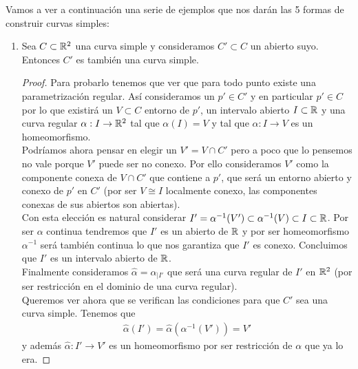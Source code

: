 \begin{ejemplo}\label{ej:construccion} Vamos a ver a continuación una serie de ejemplos que nos darán las 5 formas de construir curvas simples:
    \begin{enumerate}
        \item\label{ej:abierto} Sea $C\subset \mathbb{R}^2$ una curva simple y consideramos $C'\subset C$ un abierto suyo. Entonces $C'$ es también una curva simple.
        \begin{proof}
            Para probarlo tenemos que ver que para todo punto existe una parametrización regular. Así consideramos un $p'\in C'$ y en particular $p'\in C$ por lo que existirá un $V\subset C$ entorno de $p'$, un intervalo abierto $I\subset \mathbb{R}$ y una curva regular $\alpha : I \to \mathbb{R}^2$ tal que $\alpha(I)=V$ y tal que $\alpha : I \to V$ es un homeomorfismo.\\

            Podríamos ahora pensar en elegir un $V'=V\cap C'$ pero a poco que lo pensemos no vale porque $V'$ puede ser no conexo. Por ello consideramos $V'$ como la componente conexa de $V\cap C'$ que contiene a $p'$, que será un entorno abierto y conexo de $p'$ en $C'$ (por ser $V\cong I$ localmente conexo, las componentes conexas de sus abiertos son abiertas).\\

            Con esta elección es natural considerar $I'=\alpha^{-1}(V') \subset \alpha^{-1}(V) \subset I \subset \mathbb{R}$. Por ser $\alpha$ continua tendremos que $I'$ es un abierto de $\mathbb{R}$ y por ser homeomorfismo $\alpha^{-1}$ será también continua lo que nos garantiza que $I'$ es conexo. Concluimos que $I'$ es un intervalo abierto de $\mathbb{R}$.\\

            Finalmente consideramos $\hat{\alpha} = \alpha_{|I'}$ que será una curva regular de $I'$ en $\mathbb{R}^2$ (por ser restricción en el dominio de una curva regular). \\
            
            Queremos ver ahora que se verifican las condiciones para que $C'$ sea una curva simple. Tenemos que 
            \begin{gather*}
                \hat{\alpha}(I') = \hat{\alpha} (\alpha^{-1} (V')) = V'
            \end{gather*}
            y además $\hat{\alpha}:I'\to V'$ es un homeomorfismo por ser restricción de $\alpha$ que ya lo era.
        \end{proof}


\end{enumerate}
\end{ejemplo}
